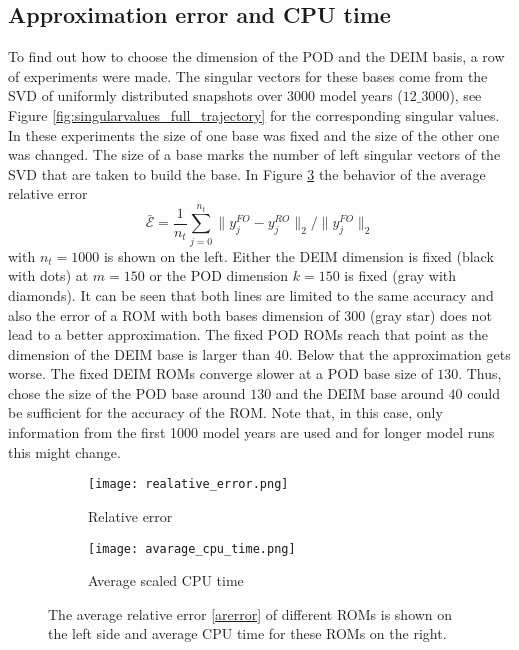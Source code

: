 \subsection{Approximation error and CPU time}\label{approxerrocputime}
To find out how to choose the dimension of the POD and the DEIM basis, a row of experiments were made. The singular vectors for these bases come from the SVD of uniformly distributed snapshots over 3000 model years ($12\_3000$), see Figure \ref{fig:singularvalues_full_trajectory}
for the corresponding singular values. In these experiments the size of one base was fixed and the size of the other one was changed. The size of a base marks the number of left singular vectors of the SVD that are taken to build the base. 
In Figure \ref{fig:comparison_differnt_pod_diem}
the behavior of the average relative error 
\begin{equation}\label{arerror}
\bar{\mathcal{E}} = \frac{1}{n_t} \sum\limits_{j=0}^{n_t}{ \parallel y^{FO}_j - y^{RO}_j \parallel_2/ \parallel y^{FO}_j \parallel_2}
\end{equation}
with $n_t = 1000$ is shown on the left. Either the DEIM dimension is fixed (black with dots) at $m=150$ or the POD dimension $k=150$ is fixed (gray with diamonds). It can be seen that both lines are limited to
the same accuracy and also the error of a ROM with both bases dimension of $300$ (gray star) does not lead to a better
approximation. The fixed POD ROMs reach that point as the dimension of the DEIM base is larger than $40$. Below that the approximation
gets worse. The fixed DEIM ROMs converge slower at a POD base size of $130$. Thus, chose the size of the POD base around $
130$ and the DEIM base around $40$ could be sufficient for the accuracy of the ROM. Note that, in this case, only information from the first 1000 model years are used and for longer model runs this might change.

\begin{figure}[H]
\centering
\begin{subfigure}{.5\textwidth}
  \centering
  \texttt{[image: realative\_error.png]}
  \caption{Relative error}
  \label{fig:compare_sub1}
\end{subfigure}%
\begin{subfigure}{.5\textwidth}
  \centering
  \texttt{[image: avarage\_cpu\_time.png]}
  \caption{Average scaled CPU time}
  \label{fig:compare_sub2}
\end{subfigure}
\caption[The average relative error and the average CPU time of different ROMs of the N-Model.]{The average relative error \eqref{arerror} of different ROMs is shown on the left side and average CPU time for these ROMs on the right.}
\label{fig:comparison_differnt_pod_diem}
\end{figure}


